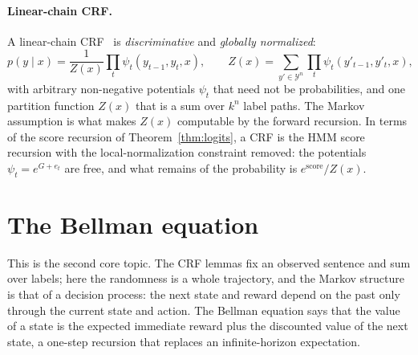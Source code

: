\documentclass[11pt,a4paper]{article}
\newcommand{\Y}{\mathcal{Y}}
\begin{document}
\paragraph{Linear-chain CRF.}
A linear-chain CRF~\cite{lafferty2001crf,sutton2012crf} is \emph{discriminative} and \emph{globally normalized}:
\[
p(y\mid x)=\frac1{Z(x)}\prod_{t}\psi_t(y_{t-1},y_t,x),\qquad Z(x)=\sum_{y'\in\Y^{n}}\prod_t\psi_t(y'_{t-1},y'_t,x),
\]
with arbitrary non-negative potentials $\psi_t$ that need not be probabilities, and one partition function $Z(x)$ that is a sum over $k^n$ label paths.
The Markov assumption is what makes $Z(x)$ computable by the forward recursion.
In terms of the score recursion of Theorem~\ref{thm:logits}, a CRF is the HMM score recursion with the local-normalization constraint removed: the potentials $\psi_t=e^{G+e_t}$ are free, and what remains of the probability is $e^{\text{score}}/Z(x)$.

\section{The Bellman equation}
\label{sec:bellman}

This is the second core topic.
The CRF lemmas fix an observed sentence and sum over labels; here the randomness is a whole trajectory, and the Markov structure is that of a decision process: the next state and reward depend on the past only through the current state and action.
The Bellman equation says that the value of a state is the expected immediate reward plus the discounted value of the next state, a one-step recursion that replaces an infinite-horizon expectation.
\end{document}
